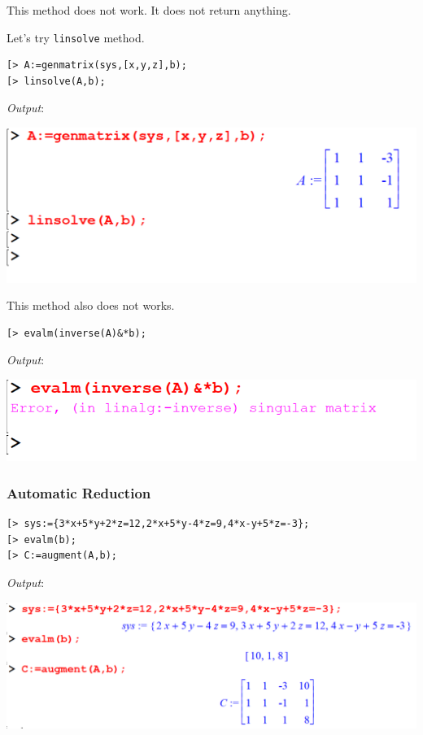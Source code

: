 \documentclass[
]{book}
\theoremstyle{definition}
\theoremstyle{definition}
\theoremstyle{definition}
\theoremstyle{definition}
\theoremstyle{remark}
\begin{document}
This method does not work. It does not return anything.

Let's try \texttt{linsolve} method.

\begin{verbatim}
[> A:=genmatrix(sys,[x,y,z],b);
[> linsolve(A,b);
\end{verbatim}

\emph{Output}:

\includegraphics{figures/Lesson 5/fig12.png}

This method also does not works.

\begin{verbatim}
[> evalm(inverse(A)&*b);
\end{verbatim}

\emph{Output}:

\includegraphics{figures/Lesson 5/fig13.png}

\subsubsection{Automatic Reduction}\label{automatic-reduction}

\begin{verbatim}
[> sys:={3*x+5*y+2*z=12,2*x+5*y-4*z=9,4*x-y+5*z=-3};
[> evalm(b);
[> C:=augment(A,b);
\end{verbatim}

\emph{Output}:

\includegraphics{figures/Lesson 5/fig14.png}
\end{document}
